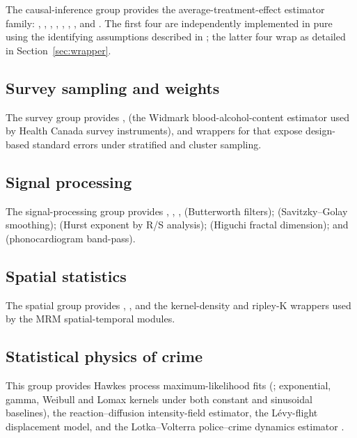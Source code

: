 \documentclass[article,shortnames,nojss]{jss}
\begin{document}
The causal-inference group provides the average-treatment-effect
estimator family: , ,
, ,
, ,
, and . The first four
are independently implemented in pure  using the
identifying assumptions described in \citet{Ruhela2026MRM}; the
latter four wrap  as detailed in
Section~\ref{sec:wrapper}.

\subsection{Survey sampling and weights}

The survey group provides ,
 (the Widmark blood-alcohol-content
estimator used by Health Canada survey instruments), and wrappers
for  that expose design-based standard errors under
stratified and cluster sampling.

\subsection{Signal processing}

The signal-processing group provides ,
, ,  (Butterworth
filters);  (Savitzky--Golay smoothing);
 (Hurst exponent by R/S analysis);
 (Higuchi fractal dimension); and 
(phonocardiogram band-pass).

\subsection{Spatial statistics}

The spatial group provides , ,
and the kernel-density and ripley-K wrappers used by the MRM
spatial-temporal modules.

\subsection{Statistical physics of crime}

This group provides Hawkes process maximum-likelihood fits
(; exponential, gamma, Weibull and Lomax kernels under both constant and sinusoidal baselines),
the reaction--diffusion intensity-field estimator, the L\'evy-flight
displacement model, and the Lotka--Volterra police--crime dynamics
estimator \citep{Mohler2011, Ruhela2026Hawkes}.
\end{document}
